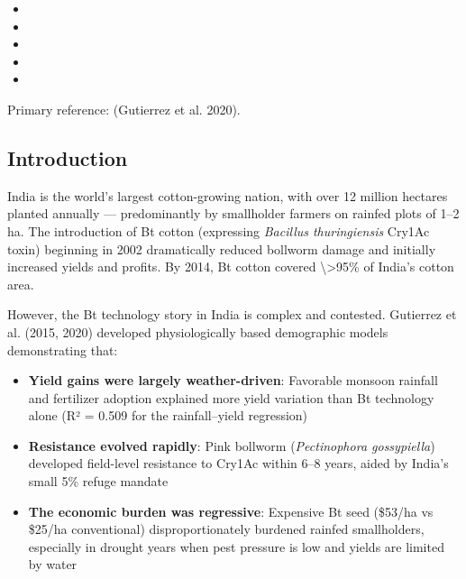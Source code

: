 \begin{itemize}
\begin{itemize}
\item {}


\item {}


\item {}


\item {}


\item {}

\end{itemize}
\end{itemize}


Primary reference: (Gutierrez et al. 2020).



\subsection{Introduction}



\label{16879307210612674453}{}


India is the world’s largest cotton-growing nation, with over 12 million hectares planted annually — predominantly by smallholder farmers on rainfed plots of 1–2 ha. The introduction of Bt cotton (expressing \emph{Bacillus thuringiensis} Cry1Ac toxin) beginning in 2002 dramatically reduced bollworm damage and initially increased yields and profits. By 2014, Bt cotton covered {\textbackslash}>95\% of India’s cotton area.



However, the Bt technology story in India is complex and contested. Gutierrez et al. (2015, 2020) developed physiologically based demographic models demonstrating that:



\begin{itemize}
\item \textbf{Yield gains were largely weather-driven}: Favorable monsoon rainfall and fertilizer adoption explained more yield variation than Bt technology alone (R² = 0.509 for the rainfall–yield regression)


\item \textbf{Resistance evolved rapidly}: Pink bollworm (\emph{Pectinophora gossypiella}) developed field-level resistance to Cry1Ac within 6–8 years, aided by India’s small 5\% refuge mandate


\item \textbf{The economic burden was regressive}: Expensive Bt seed (\$53/ha vs \$25/ha conventional) disproportionately burdened rainfed smallholders, especially in drought years when pest pressure is low and yields are limited by water

\end{itemize}



